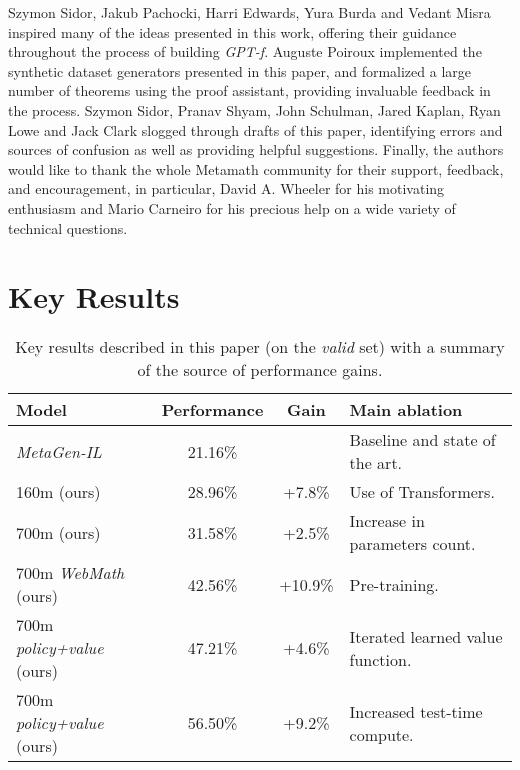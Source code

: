 \documentclass{article}
\begin{document}
\begin{ack}
Szymon Sidor, Jakub Pachocki, Harri Edwards, Yura Burda and Vedant Misra inspired many of the ideas presented in this work, offering their guidance throughout the process of building \textit{GPT-f}. Auguste Poiroux implemented the synthetic dataset generators presented in this paper, and formalized a large number of theorems using the proof assistant, providing invaluable feedback in the process. Szymon Sidor, Pranav Shyam, John Schulman, Jared Kaplan, Ryan Lowe and Jack Clark slogged through drafts of this paper, identifying errors and sources of confusion as well as providing helpful suggestions. Finally, the authors would like to thank the whole Metamath community for their support, feedback, and encouragement, in particular, David A. Wheeler for his motivating enthusiasm and Mario Carneiro for his precious help on a wide variety of technical questions.
\end{ack}




\appendix
\section{Key Results}

\begin{table}[ht]
\caption{Key results described in this paper (on the \textit{valid} set) with a summary of the source of performance gains.}
\centering
\begin{tabular}{ |l|c|c|l| }
    \hline
    Model & Performance & Gain & Main ablation \\
    \hline
    \textit{MetaGen-IL}~\cite{wang2020learning} & 21.16\% & & Baseline and state of the art. \\
    160m (ours) & 28.96\% & +7.8\% & Use of Transformers. \\
    700m (ours) & 31.58\% & +2.5\% & Increase in parameters count. \\
    700m \textit{WebMath} (ours) & 42.56\% & +10.9\% & Pre-training. \\
    700m \textit{policy+value} (ours) & 47.21\% & +4.6\% & Iterated learned value function. \\
    700m \textit{policy+value}  (ours) & 56.50\% & +9.2\% & Increased test-time compute. \\
    \hline
\end{tabular}
\label{table:keyresults}
\end{table}
\end{document}
